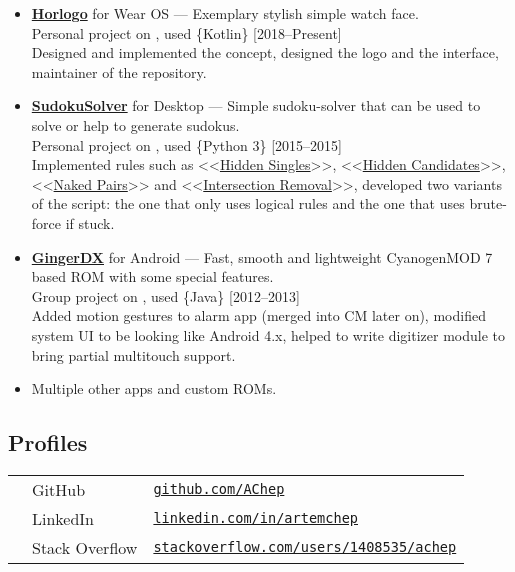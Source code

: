 \documentclass[a4paper]{article}
\begin{document}
\begin{itemize}
		\item \href{https://play.google.com/store/apps/details?id=com.artemchep.horlogo}{\textbf{Horlogo}} for Wear OS --- Exemplary stylish simple watch face. \\[0.2em]
		{\footnotesize Personal project on \faGithub, used \{Kotlin\} \hfill [2018--Present]} \\[0.2em]
		Designed and implemented the concept, designed the logo and the interface, maintainer of the repository.
		
		\item \href{https://github.com/AChep/SudokuSolver}{\textbf{SudokuSolver}} for Desktop --- Simple sudoku-solver that can be used to solve or help to generate sudokus. \\[0.2em]
		{\footnotesize Personal project on \faGithub, used \{Python 3\} \hfill [2015--2015]} \\[0.2em]
		Implemented rules such as <<\href{http://www.sudokuwiki.org/Getting_Started}{Hidden Singles}>>, <<\href{http://www.sudokuwiki.org/Hidden_Candidates}{Hidden Candidates}>>, <<\href{http://www.sudokuwiki.org/Naked_Candidates#NP}{Naked Pairs}>> and <<\href{http://www.sudokuwiki.org/intersection_removal}{Intersection Removal}>>, developed two variants of the script: the one that only uses logical rules and the one that uses brute-force if stuck.
		
		\item \href{https://forum.xda-developers.com/showthread.php?t=1188486}{\textbf{GingerDX}} for Android --- Fast, smooth and lightweight CyanogenMOD 7 based ROM with some special features. \\[0.2em]
		{\footnotesize Group project on \faGithub, used \{Java\} \hfill [2012--2013]} \\[0.2em] 
		Added motion gestures to alarm app (merged into CM later on), modified system UI to be looking like Android 4.x, helped to write digitizer module to bring partial multitouch support.  

		\item Multiple other apps and custom ROMs.
	\end{itemize}
	\subsection*{Profiles}
	\begin{tabular}{@{}lll}
		\faGithub & GitHub & \href{https://github.com/AChep}{\texttt{github.com/AChep}} \\
		\faLinkedin & LinkedIn & \href{https://www.linkedin.com/in/artemchep/}{\texttt{linkedin.com/in/artemchep}} \\
		\faStackOverflow & Stack Overflow & \href{https://stackoverflow.com/users/1408535/achep}{\texttt{stackoverflow.com/users/1408535/achep}} \\
	\end{tabular}
\end{document}
